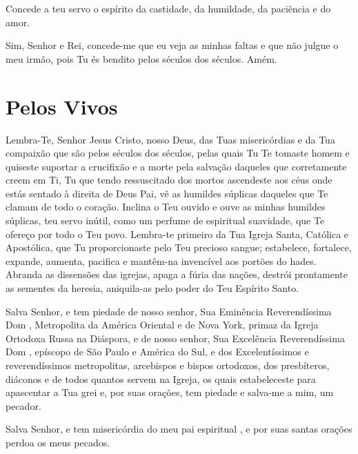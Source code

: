 \documentclass{subfiles}
\begin{document}
Concede a teu servo o espírito da castidade, da humildade, da paciência e do amor.

Sim, Senhor e Rei, concede-me que eu veja as minhas faltas e que não julgue o meu
irmão, pois Tu és bendito pelos séculos dos séculos. Amém.



\section*{Pelos Vivos}

Lembra-Te, Senhor Jesus Cristo, nosso Deus, das Tuas misericórdias e da Tua
compaixão que são pelos séculos dos séculos, pelas quais Tu Te tomaste homem e
quiseste suportar a crucifixão e a morte pela salvação daqueles que corretamente
creem em Ti, Tu que tendo ressuscitado dos mortos ascendeste aos céus onde estás
sentado à direita de Deus Pai, vê as humildes súplicas daqueles que Te clamam de
todo o coração. Inclina o Teu ouvido e ouve as minhas humildes súplicas, teu
servo inútil, como um perfume de espiritual suavidade, que Te ofereço por todo o
Teu povo. Lembra-te primeiro da Tua Igreja Santa, Católica e Apostólica, que Tu
proporcionaste pelo Teu precioso sangue; estabelece, fortalece, expande,
aumenta, pacifica e mantêm-na invencível aos portões do hades. Abranda as
dissensões das igrejas, apaga a fúria das nações, destrói prontamente as
sementes da heresia, aniquila-as pelo poder do Teu Espírito Santo.
\metanoia{}

Salva Senhor, e tem piedade de nosso senhor, Sua Eminência Reverendíssima Dom
\name, Metropolita da América Oriental e de Nova York, primaz da Igreja
Ortodoxa Russa na Diáspora, e de nosso senhor, Sua Excelência Reverendíssima Dom
\name, epíscopo de São Paulo e América do Sul, e dos Excelentíssimos e
reverendíssimos metropolitas, arcebispos e bispos ortodoxos, dos presbíteros,
diáconos e de todos quantos servem na Igreja, os quais estabeleceste para
apascentar a Tua grei e, por suas orações, tem piedade e salva-me a mim, um
pecador. \metanoia{}

Salva Senhor, e tem misericórdia do meu pai espiritual \name, e por
suas santas orações perdoa os meus pecados. \metanoia{}
\end{document}

